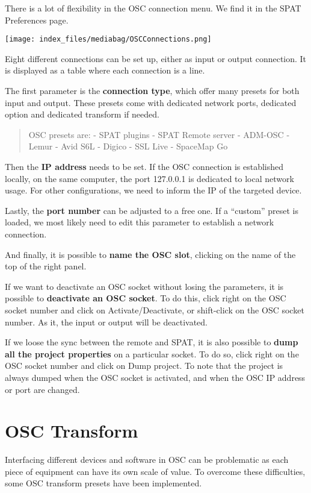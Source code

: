 \documentclass[
  letterpaper,
  DIV=11,
  numbers=noendperiod]{scrreport}
\begin{document}
There is a lot of flexibility in the OSC connection menu. We find it in
the SPAT Preferences page.

\texttt{[image: index\_files/mediabag/OSCConnections.png]}

Eight different connections can be set up, either as input or output
connection. It is displayed as a table where each connection is a line.

The first parameter is the \textbf{connection type}, which offer many
presets for both input and output. These presets come with dedicated
network ports, dedicated option and dedicated transform if needed.

\begin{quote}
OSC presets are: - SPAT plugins - SPAT Remote server - ADM-OSC - Lemur -
Avid S6L - Digico - SSL Live - SpaceMap Go
\end{quote}

Then the \textbf{IP address} needs to be set. If the OSC connection is
established locally, on the same computer, the port 127.0.0.1 is
dedicated to local network usage. For other configurations, we need to
inform the IP of the targeted device.

Lastly, the \textbf{port number} can be adjusted to a free one. If a
``custom'' preset is loaded, we most likely need to edit this parameter
to establish a network connection.

And finally, it is possible to \textbf{name the OSC slot}, clicking on
the name of the top of the right panel.

If we want to deactivate an OSC socket without losing the parameters, it
is possible to \textbf{deactivate an OSC socket}. To do this, click
right on the OSC socket number and click on Activate/Deactivate, or
shift-click on the OSC socket number. As it, the input or output will be
deactivated.

If we loose the sync between the remote and SPAT, it is also possible to
\textbf{dump all the project properties} on a particular socket. To do
so, click right on the OSC socket number and click on Dump project. To
note that the project is always dumped when the OSC socket is activated,
and when the OSC IP address or port are changed.

\hypertarget{osc-transform}{%
\section{OSC Transform}\label{osc-transform}}

Interfacing different devices and software in OSC can be problematic as
each piece of equipment can have its own scale of value. To overcome
these difficulties, some OSC transform presets have been implemented.
\end{document}
